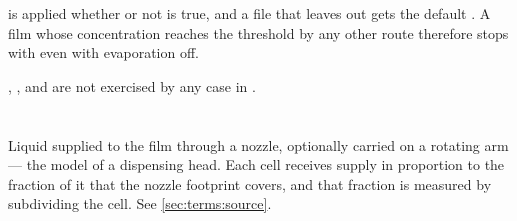 \begin{warn}
   is applied whether or not  is true, and a
  file that leaves  out gets the default
  . A film whose concentration reaches the threshold by any other
  route therefore stops with  even with evaporation off.
\end{warn}

, ,
 and  are not exercised by any case in
.

\section{}
\label{sec:ref-physics:source}

Liquid supplied to the film through a nozzle, optionally carried on a rotating
arm --- the model of a dispensing head. Each cell receives supply in
proportion to the fraction of it that the nozzle footprint covers, and that
fraction is measured by subdividing the cell. See \cref{sec:terms:source}.

